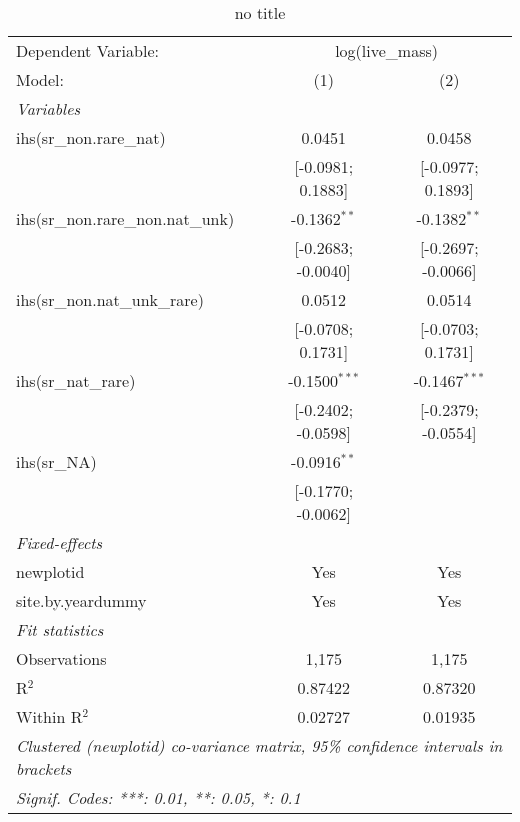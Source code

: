 
\begin{table}[htbp]
   \caption{no title}
   \centering
   \begin{tabular}{lcc}
      \tabularnewline \midrule \midrule
      Dependent Variable: & \multicolumn{2}{c}{log(live\_mass)}\\
      Model:                             & (1)                & (2)\\  
      \midrule
      \emph{Variables}\\
      ihs(sr\_non.rare\_nat)             & 0.0451             & 0.0458\\   
                                         & [-0.0981; 0.1883]  & [-0.0977; 0.1893]\\   
      ihs(sr\_non.rare\_non.nat\_unk)    & -0.1362$^{**}$     & -0.1382$^{**}$\\   
                                         & [-0.2683; -0.0040] & [-0.2697; -0.0066]\\   
      ihs(sr\_non.nat\_unk\_rare)        & 0.0512             & 0.0514\\   
                                         & [-0.0708; 0.1731]  & [-0.0703; 0.1731]\\   
      ihs(sr\_nat\_rare)                 & -0.1500$^{***}$    & -0.1467$^{***}$\\   
                                         & [-0.2402; -0.0598] & [-0.2379; -0.0554]\\   
      ihs(sr\_NA)                        & -0.0916$^{**}$     &   \\   
                                         & [-0.1770; -0.0062] &   \\   
      \midrule
      \emph{Fixed-effects}\\
      newplotid                          & Yes                & Yes\\  
      site.by.yeardummy                  & Yes                & Yes\\  
      \midrule
      \emph{Fit statistics}\\
      Observations                       & 1,175              & 1,175\\  
      R$^2$                              & 0.87422            & 0.87320\\  
      Within R$^2$                       & 0.02727            & 0.01935\\  
      \midrule \midrule
      \multicolumn{3}{l}{\emph{Clustered (newplotid) co-variance matrix, 95\% confidence intervals in brackets}}\\
      \multicolumn{3}{l}{\emph{Signif. Codes: ***: 0.01, **: 0.05, *: 0.1}}\\
   \end{tabular}
\end{table}


